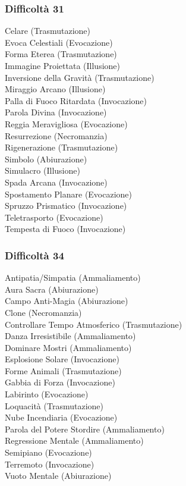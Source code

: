 \begin{multicols}{3}
	\subsubsection{Difficoltà 31}
	Celare (Trasmutazione)\\
	Evoca Celestiali (Evocazione)\\
	Forma Eterea (Trasmutazione)\\
	Immagine Proiettata (Illusione)\\
	Inversione della Gravità (Trasmutazione)\\
	Miraggio Arcano (Illusione)\\
	Palla di Fuoco Ritardata (Invocazione)\\
	Parola Divina (Invocazione)\\
	Reggia Meravigliosa (Evocazione)\\
	Resurrezione (Necromanzia)\\
	Rigenerazione (Trasmutazione)\\
	Simbolo (Abiurazione)\\
	Simulacro (Illusione)\\
	Spada Arcana (Invocazione)\\
	Spostamento Planare (Evocazione)\\
	Spruzzo Prismatico (Invocazione)\\
	Teletrasporto (Evocazione)\\
	Tempesta di Fuoco (Invocazione)\\
	
	\subsubsection{Difficoltà 34}
	Antipatia/Simpatia (Ammaliamento)\\
	Aura Sacra (Abiurazione)\\
	Campo Anti-Magia (Abiurazione)\\
	Clone (Necromanzia)\\
	Controllare Tempo Atmosferico (Trasmutazione)\\
	Danza Irresistibile (Ammaliamento)\\
	Dominare Mostri (Ammaliamento)\\
	Esplosione Solare (Invocazione)\\
	Forme Animali (Trasmutazione)\\
	Gabbia di Forza (Invocazione)\\
	Labirinto (Evocazione)\\
	Loquacità (Trasmutazione)\\
	Nube Incendiaria (Evocazione)\\
	Parola del Potere Stordire (Ammaliamento)\\
	Regressione Mentale (Ammaliamento)\\
	Semipiano (Evocazione)\\
	Terremoto (Invocazione)\\
	Vuoto Mentale (Abiurazione)\\
	

\end{multicols}
